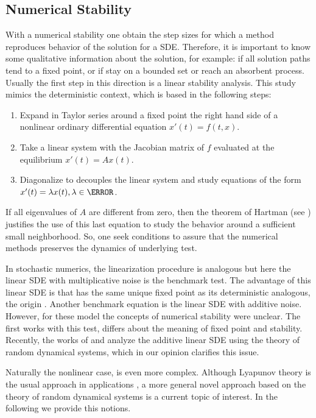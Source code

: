 \subsection{Numerical Stability}
	With a numerical stability  one obtain  the step sizes for which a method reproduces  behavior of the solution 
	for a SDE. Therefore, it is important to know some qualitative  information  about the  solution, for example: if 
	all solution paths tend to a fixed point, or  if stay on a bounded set or reach an absorbent process.
	Usually the first step in this direction is a linear stability analysis. This study mimics the deterministic 
	context, which is based in the following steps:
	\begin{enumerate}
		\item 
			Expand in Taylor series around a fixed point the right hand side of a nonlinear ordinary differential 
			equation $x'(t) = f(t,x)$.
		\item
			Take a linear system with the Jacobian matrix of $f$ evaluated at the equilibrium
			$x'(t) = Ax(t)$.
		\item
			Diagonalize to decouples the linear system and study equations of the form
			$x'(t) = \lambda x(t), \lambda \in \C$.
	\end{enumerate}
	If all eigenvalues of $A$ are different from zero, then the  theorem of Hartman (see \cite{Hartman1960}) justifies 
	the use of this last equation  to study the behavior around a sufficient small neighborhood. So, one 
	seek conditions to assure that the numerical methods preserves the dynamics of underlying test. 
		
		In stochastic numerics, the linearization procedure is analogous  but here the linear SDE with multiplicative 
	noise is the benchmark test. The advantage of this linear SDE is that has the same unique fixed point as its 
	deterministic analogous, the origin \cite[]{Higham2000} .  Another benchmark equation is the linear SDE with 
	additive noise. However, for these model the concepts of numerical stability were unclear. The first works with 
	this test\cite{Hernandez1992,Milstein2004,Artemiev1997}, differs about the meaning of fixed point and stability. 
	Recently, the works of \citeauthor*{CruzCancino2010} \cite{CruzCancino2010} and \citeauthor*{Buckwar2011a} 
	\cite{Buckwar2011a} analyze the additive linear SDE using the theory of random dynamical systems, which in our 
	opinion clarifies this issue.
	
		Naturally the nonlinear case, is even more complex. Although  Lyapunov theory is the usual approach in 
	applications \cite{Khasminskii2011}, a more general novel approach based on the theory of random dynamical 
	systems \cite{Arnold1998} is a current topic of interest. In the following we provide this notions. 
		

